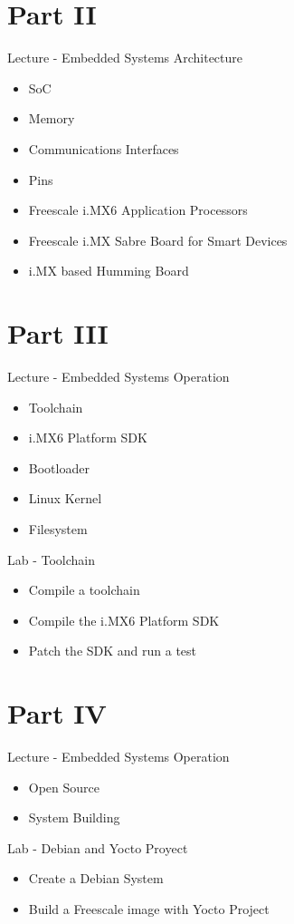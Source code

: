 \documentclass[a4paper,12pt,obeyspaces,spaces,hyphens]{article}
\begin{document}
\section{Part II}

\feagendaonecolumn
{Lecture - Embedded Systems Architecture}
{
  \begin{itemize}
    \item SoC
    \item Memory
    \item Communications Interfaces
    \item Pins
    \item Freescale i.MX6 Application Processors
    \item Freescale i.MX Sabre Board for Smart Devices
    \item i.MX based Humming Board
  \end{itemize}
}

\section{Part III}

\feagendatwocolumn
{Lecture - Embedded Systems Operation}
{
    \begin{itemize}
      \item Toolchain
      \item i.MX6 Platform SDK
      \item Bootloader
      \item Linux Kernel
      \item Filesystem
    \end{itemize}
}
{Lab - Toolchain}
{
  \begin{itemize}
    \item Compile a toolchain
    \item Compile the i.MX6 Platform SDK
    \item Patch the SDK and run a test
 \end{itemize}
}

\section{Part IV}

\feagendatwocolumn
{Lecture - Embedded Systems Operation}
{
  \begin{itemize}
    \item Open Source
    \item System Building
  \end{itemize}
}
{Lab - Debian and Yocto Proyect}
{
  \begin{itemize}
    \item Create a Debian System
    \item Build a Freescale image with Yocto Project
 \end{itemize}
}
\end{document}

